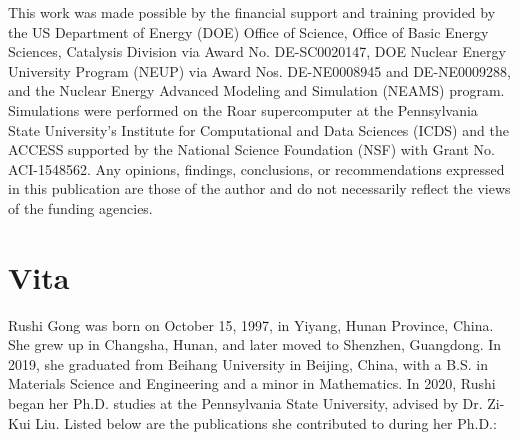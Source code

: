 \documentclass[letterpaper, 12pt]{report}
\begin{document}
This work was made possible by the financial support and training provided by the US Department of Energy (DOE) Office of Science, Office of Basic Energy Sciences, Catalysis Division via Award No. DE-SC0020147, DOE Nuclear Energy University Program (NEUP) via Award Nos. DE-NE0008945 and DE-NE0009288, and the Nuclear Energy Advanced Modeling and Simulation (NEAMS) program. Simulations were performed on the Roar supercomputer at the Pennsylvania State University's Institute for Computational and Data Sciences (ICDS) and the ACCESS supported by the National Science Foundation (NSF) with Grant No. ACI-1548562. Any opinions, findings, conclusions, or recommendations expressed in this publication are those of the author and do not necessarily reflect the views of the funding agencies.


\newpage
\setlength\parindent{2em} %













\printbibliography[
heading=bibintoc,
title={Bibliography}
]

\newpage
\chapter*{Vita}
\thispagestyle{empty}
\vspace{-6pt}

{\small
Rushi Gong was born on October 15, 1997, in Yiyang, Hunan Province, China. She grew up in Changsha, Hunan, and later moved to Shenzhen, Guangdong. In 2019, she graduated from Beihang University in Beijing, China, with a B.S. in Materials Science and Engineering and a minor in Mathematics. In 2020, Rushi began her Ph.D. studies at the Pennsylvania State University, advised by Dr. Zi-Kui Liu. Listed below are the publications she contributed to during her Ph.D.:
\fontsize{10}{10}\selectfont

}
\end{document}
